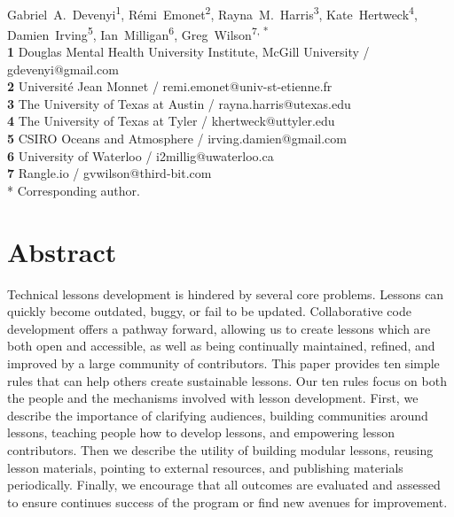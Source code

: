 \documentclass[10pt,letterpaper]{article}
\date{}
\begin{document}
\vspace*{0.2in}

\begin{flushleft}
{\Large
\textbf{}
}
\newline
\\
{Gabriel~A.~Devenyi}\textsuperscript{1},
{R\'{e}mi~Emonet}\textsuperscript{2},
{Rayna~M.~Harris}\textsuperscript{3},
{Kate~Hertweck}\textsuperscript{4},
{Damien~Irving}\textsuperscript{5},
{Ian~Milligan}\textsuperscript{6},
{Greg~Wilson}\textsuperscript{7, *}
\\
\textbf{1} Douglas Mental Health University Institute, McGill University / gdevenyi@gmail.com \\
\textbf{2} Universit\'{e} Jean Monnet / remi.emonet@univ-st-etienne.fr \\
\textbf{3} The University of Texas at Austin / rayna.harris@utexas.edu \\
\textbf{4} The University of Texas at Tyler / khertweck@uttyler.edu \\
\textbf{5} CSIRO Oceans and Atmosphere / irving.damien@gmail.com \\
\textbf{6} University of Waterloo / i2millig@uwaterloo.ca \\
\textbf{7} Rangle.io / gvwilson@third-bit.com
\\
* Corresponding author.
\end{flushleft}

\section*{Abstract}

Technical lessons development is hindered by several core problems. 
Lessons can quickly become outdated, buggy, or fail to be updated. 
Collaborative code development offers a pathway forward, allowing us to 
create lessons which are both open and accessible, as well as 
being continually maintained, refined, and improved by a large
community of contributors. This paper provides ten simple rules that can help
others create sustainable lessons. 
Our ten rules focus on both the people and the mechanisms involved with 
lesson development. First, we describe the importance of clarifying audiences, 
building communities around lessons, teaching people how to develop lessons, 
and empowering lesson contributors. Then we describe the utility of 
building modular lessons, reusing lesson materials, pointing to external resources, 
and publishing materials periodically. Finally, we encourage that all outcomes 
are evaluated and assessed to ensure continues success of the program or 
find new avenues for improvement.
\end{document}
